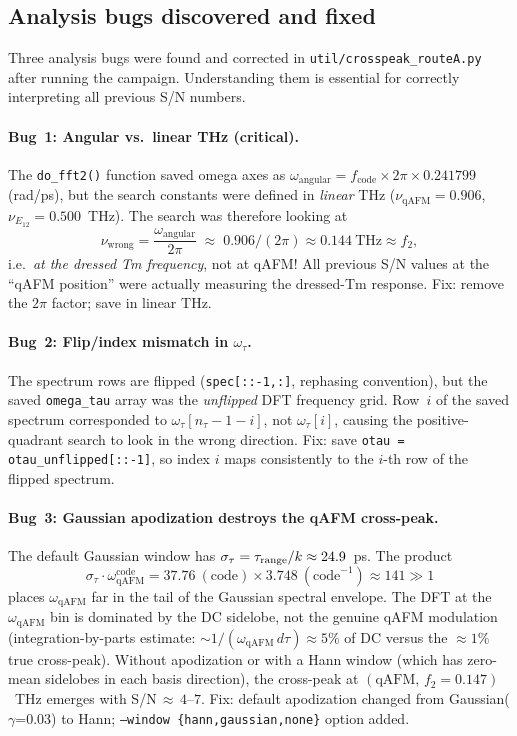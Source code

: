 \documentclass[11pt,a4paper]{article}
\newcommand{\qAFM}{\mathrm{qAFM}}
\newcommand{\EtA}{E_{12}}
\newcommand{\meVtoTHz}{0.241799}
\begin{document}
\subsection{Analysis bugs discovered and fixed}\label{sec:bugs}

Three analysis bugs were found and corrected in \texttt{util/crosspeak\_routeA.py}
after running the campaign. Understanding them is essential for correctly
interpreting all previous S/N numbers.

\paragraph{Bug~1: Angular vs.\ linear THz (critical).}
The \texttt{do\_fft2()} function saved omega axes as
$\omega_{\text{angular}} = f_{\text{code}}\times 2\pi\times\meVtoTHz$ (rad/ps),
but the search constants were defined in \emph{linear} THz
($\nu_{\qAFM}=0.906$, $\nu_{\EtA}=0.500$~THz). The search was therefore
looking at
\[
  \nu_{\text{wrong}} = \frac{\omega_{\text{angular}}}{2\pi}
  \;\approx\; 0.906/(2\pi) \approx 0.144~\text{THz}\approx f_2,
\]
i.e.\ \emph{at the dressed Tm frequency}, not at qAFM! All previous S/N values
at the ``qAFM position'' were actually measuring the dressed-Tm response.
Fix: remove the $2\pi$ factor; save in linear THz.

\paragraph{Bug~2: Flip/index mismatch in $\omega_\tau$.}
The spectrum rows are flipped (\texttt{spec[::-1,:]}, rephasing convention), but
the saved \texttt{omega\_tau} array was the \emph{unflipped} DFT frequency grid.
Row~$i$ of the saved spectrum corresponded to
$\omega_\tau[n_\tau - 1 - i]$, not $\omega_\tau[i]$, causing the positive-quadrant
search to look in the wrong direction.
Fix: save \texttt{otau = otau\_unflipped[::-1]}, so index $i$ maps consistently
to the $i$-th row of the flipped spectrum.

\paragraph{Bug~3: Gaussian apodization destroys the qAFM cross-peak.}
The default Gaussian window has $\sigma_\tau = \tau_{\rm range}/k \approx 24.9$~ps.
The product
\[
  \sigma_\tau \cdot \omega_\qAFM^{\text{code}}
  = 37.76~(\text{code})\times 3.748~(\text{code}^{-1}) \approx 141 \gg 1
\]
places $\omega_\qAFM$ far in the tail of the Gaussian spectral envelope.
The DFT at the $\omega_\qAFM$ bin is dominated by the DC sidelobe,
not the genuine qAFM modulation (integration-by-parts estimate:
$\sim 1/(\omega_\qAFM\,d\tau)\approx 5\%$ of DC versus the $\approx 1\%$ true cross-peak).
Without apodization or with a Hann window (which has zero-mean sidelobes in each
basis direction), the cross-peak at $(\qAFM,\,f_2=0.147)$~THz emerges with
S/N\,$\approx\,4$--$7$.
Fix: default apodization changed from Gaussian($\gamma$=0.03) to Hann;
\texttt{--window \{hann,gaussian,none\}} option added.
\end{document}
